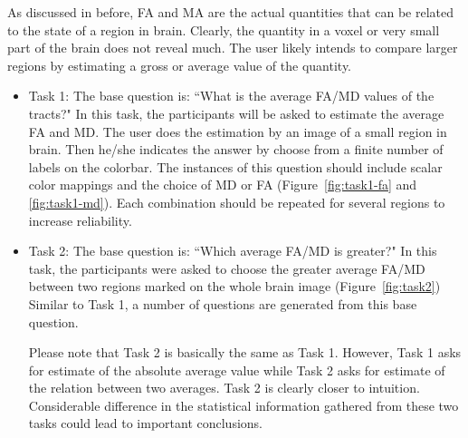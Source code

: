 \documentclass[hyperref, plainreport, noproblem]{cgvpub1}
\begin{document}
As discussed in before, FA and MA are the actual quantities that can be related to the state of a region in brain. Clearly, the quantity in a voxel or very small part of the brain does not reveal much. The user likely intends to compare larger regions by estimating a gross or average value of the quantity.
\begin{itemize}
	\item{Task 1:} The base question is: ``What is the average FA/MD values of the tracts?"
	In this task, the participants will be asked to estimate the average FA and MD. The user does the estimation by an image of a small region in brain. Then he/she indicates the answer by choose from a finite number of labels on the colorbar. The instances of this question should include scalar color mappings and the choice of MD or FA (Figure~\ref{fig:task1-fa} and \ref{fig:task1-md}). Each combination should be repeated for several regions to increase reliability. 	
	
	\item{Task 2:} The base question is: ``Which average FA/MD is greater?" 
	In this task, the participants were asked to choose the greater average FA/MD between two regions marked on the whole brain image (Figure~\ref{fig:task2}) Similar to Task 1, a number of questions are generated from this base question. 


	
	
Please note that Task 2 is basically the same as Task 1. However, Task 1 asks for estimate of the absolute average value  while Task 2 asks for estimate of the relation between two averages. Task 2 is clearly closer to intuition. Considerable difference in the statistical information gathered from these two tasks could lead to important conclusions.
	
\end{itemize}
\end{document}
